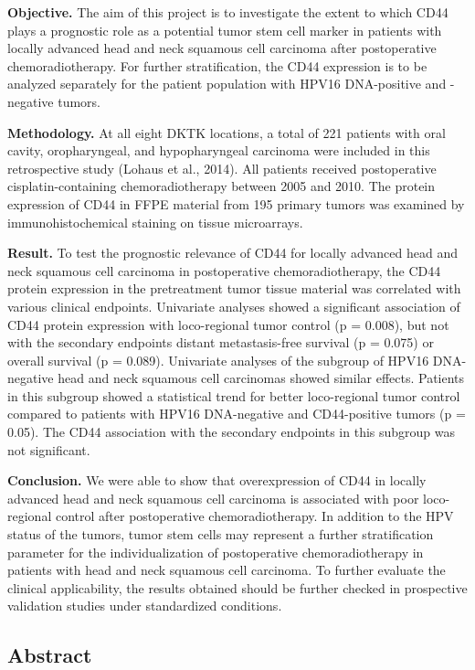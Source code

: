 \textbf{Objective.} The aim of this project is to investigate the extent to which CD44 plays a prognostic role as a potential tumor stem cell marker in patients with locally advanced head and neck squamous cell carcinoma after postoperative chemoradiotherapy. For further stratification, the CD44 expression is to be analyzed separately for the patient population with HPV16 DNA-positive and -negative tumors.

\textbf{Methodology.} At all eight DKTK locations, a total of 221 patients with oral cavity, oropharyngeal, and hypopharyngeal carcinoma were included in this retrospective study (Lohaus et al., 2014). All patients received postoperative cisplatin-containing chemoradiotherapy between 2005 and 2010. The protein expression of CD44 in FFPE material from 195 primary tumors was examined by immunohistochemical staining on tissue microarrays.

\textbf{Result.} To test the prognostic relevance of CD44 for locally advanced head and neck squamous cell carcinoma in postoperative chemoradiotherapy, the CD44 protein expression in the pretreatment tumor tissue material was correlated with various clinical endpoints. Univariate analyses showed a significant association of CD44 protein expression with loco-regional tumor control (p = 0.008), but not with the secondary endpoints distant metastasis-free survival (p = 0.075) or overall survival (p = 0.089). Univariate analyses of the subgroup of HPV16 DNA-negative head and neck squamous cell carcinomas showed similar effects. Patients in this subgroup showed a statistical trend for better loco-regional tumor control compared to patients with HPV16 DNA-negative and CD44-positive tumors (p = 0.05). The CD44 association with the secondary endpoints in this subgroup was not significant.

\textbf{Conclusion.} We were able to show that overexpression of CD44 in locally advanced head and neck squamous cell carcinoma is associated with poor loco-regional control after postoperative chemoradiotherapy. In addition to the HPV status of the tumors, tumor stem cells may represent a further stratification parameter for the individualization of postoperative chemoradiotherapy in patients with head and neck squamous cell carcinoma. To further evaluate the clinical applicability, the results obtained should be further checked in prospective validation studies under standardized conditions.

\hypertarget{abstract-1}{%
\subsection{Abstract}\label{abstract-1}}

